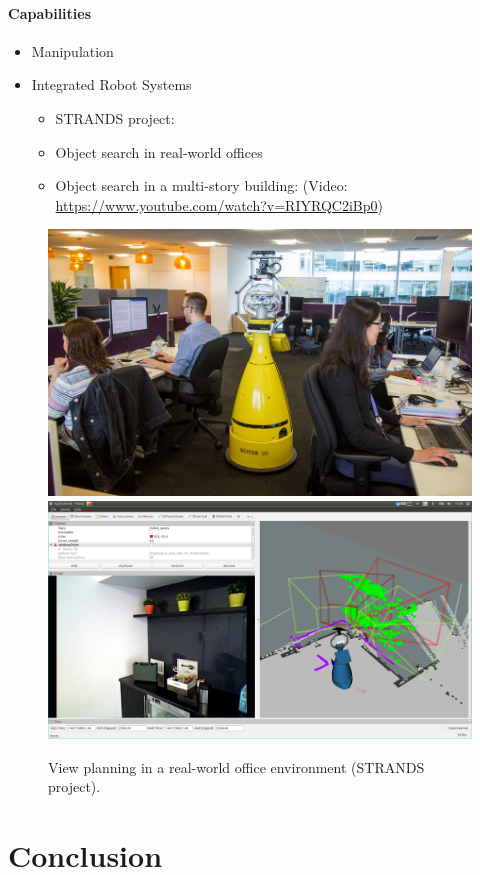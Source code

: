 \documentclass[runningheads,a4paper]{llncs}
\begin{document}
\paragraph{Capabilities}
\begin{itemize}

    \item Manipulation
    \item Integrated Robot Systems
        \begin{itemize}
            \item STRANDS project: \cite{strands@ram}
            \item Object search in real-world offices \cite{kunze14indirect}
            \item Object search in a multi-story building: \cite{kunze12objsearch} (Video: \url{https://www.youtube.com/watch?v=RIYRQC2iBp0})

        \end{itemize}
\end{itemize}

\begin{figure}[tb]
  \begin{center}
    \includegraphics[width=.43\columnwidth]{images/betty.jpg}
    \includegraphics[width=.55\columnwidth,clip,trim=10ex 20ex 10ex 20ex]{images/viewplanning_at_tsc.png}
  \end{center}   
  \caption{View planning in a real-world office environment (STRANDS project).}
  \label{fig:mk}
  \vspace{-3ex}
\end{figure}

\section{Conclusion}



\end{document}
